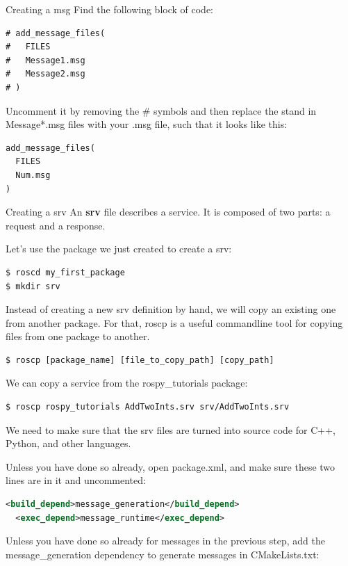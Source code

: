 \begin{frame}{Creating a msg}
Find the following block of code:
\begin{lstlisting}[language=shell]
# add_message_files(
#   FILES
#   Message1.msg
#   Message2.msg
# )
\end{lstlisting}

Uncomment it by removing the \# symbols and then replace the stand in Message*.msg files with your .msg file, such that it looks like this:

\begin{lstlisting}[language=shell]
add_message_files(
  FILES
  Num.msg
)
\end{lstlisting}
\end{frame}

\begin{frame}{Creating a srv}
An \textbf{srv} file describes a service. It is composed of two parts: a request and a response.

\vspace{.1cm}
Let's use the package we just created to create a srv:

\begin{lstlisting}[language=shell]
$ roscd my_first_package
$ mkdir srv
\end{lstlisting}

Instead of creating a new srv definition by hand, we will copy an existing one from another package. For that, roscp is a useful commandline tool for copying files from one package to another.

\begin{lstlisting}[language=syntax]
$ roscp [package_name] [file_to_copy_path] [copy_path]
\end{lstlisting}

We can copy a service from the rospy\_tutorials package:
\begin{lstlisting}[language=shell]
$ roscp rospy_tutorials AddTwoInts.srv srv/AddTwoInts.srv
\end{lstlisting}

We need to make sure that the srv files are turned into source code for C++, Python, and other languages.

Unless you have done so already, open package.xml, and make sure these two lines are in it and uncommented:
\begin{lstlisting}[language=xml]
  <build_depend>message_generation</build_depend>
  <exec_depend>message_runtime</exec_depend>
\end{lstlisting}

Unless you have done so already for messages in the previous step, add the message\_generation dependency to generate messages in CMakeLists.txt:


\end{frame}

